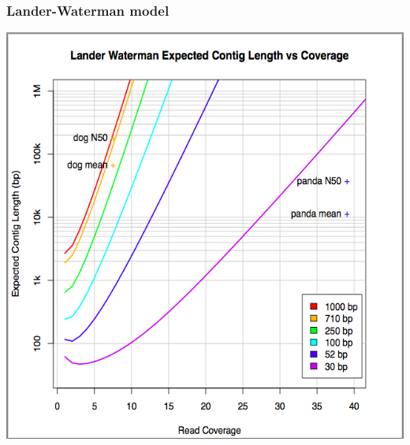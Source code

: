 \documentclass[pdf]{beamer}
\begin{document}
\begin{frame}
\frametitle{Lander-Waterman model}
\begin{center}
\includegraphics[scale=0.30]{Figures/coverage.png} 
\end{center}
\end{frame}
\end{document}
